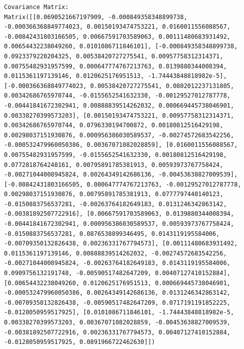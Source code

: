 \documentclass[
  letterpaper,
  DIV=11,
  numbers=noendperiod]{scrreprt}
\theoremstyle{plain}
\theoremstyle{definition}
\theoremstyle{remark}
\begin{document}
\begin{verbatim}
Covariance Matrix:
Matrix([[0.0690521667197909, -0.000849358348899738, -0.000366368849774023, 0.00150193474753221, 0.0160011556088567, -0.00842431803166505, 0.00667591703589063, 0.00111480683931492, 0.00654432238049260, 0.0101086711846101], [-0.000849358348899738, 0.0923379220204325, 0.00538420727275541, 0.00957758312314371, 0.00755482931957599, 0.000647774767213763, 0.0139880344008394, 0.0115361197139146, 0.0120625176951513, -1.74443848818982e-5], [-0.000366368849774023, 0.00538420727275541, 0.0802012237131805, 0.00342686765970744, -0.0155652541632330, -0.00129527012787778, -0.00441841672302941, 0.00888839514262032, 0.000669445738046901, 0.00338270399573203], [0.00150193474753221, 0.00957758312314371, 0.00342686765970744, 0.0796330194700872, 0.00180812516429198, 0.00298037151930876, 0.000956386030589537, -0.00274572683542256, -0.000532479960050386, 0.00367071082028859], [0.0160011556088567, 0.00755482931957599, -0.0155652541632330, 0.00180812516429198, 0.0772818764248161, 0.00795891785381913, 0.00593973767758424, -0.00271044008945824, 0.00264349142686136, -0.00453638827009539], [-0.00842431803166505, 0.000647774767213763, -0.00129527012787778, 0.00298037151930876, 0.00795891785381913, 0.0777797440140123, -0.0150883756537281, -0.00263764182649183, 0.0131246342863142, -0.00381892507722916], [0.00667591703589063, 0.0139880344008394, -0.00441841672302941, 0.000956386030589537, 0.00593973767758424, -0.0150883756537281, 0.0876538899346495, 0.0143119195584006, -0.00709350132826438, 0.00236331767794573], [0.00111480683931492, 0.0115361197139146, 0.00888839514262032, -0.00274572683542256, -0.00271044008945824, -0.00263764182649183, 0.0143119195584006, 0.0909756132191748, -0.00590517482647209, 0.00407127410152884], [0.00654432238049260, 0.0120625176951513, 0.000669445738046901, -0.000532479960050386, 0.00264349142686136, 0.0131246342863142, -0.00709350132826438, -0.00590517482647209, 0.0717191191852225, -0.0128050959517925], [0.0101086711846101, -1.74443848818982e-5, 0.00338270399573203, 0.00367071082028859, -0.00453638827009539, -0.00381892507722916, 0.00236331767794573, 0.00407127410152884, -0.0128050959517925, 0.0891966722462630]])


\end{verbatim}
\end{document}
